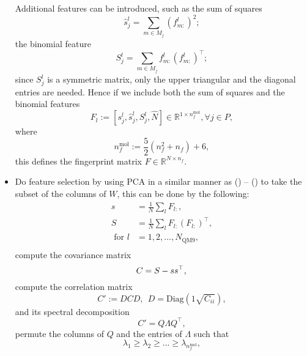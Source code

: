 \documentclass[12pt]{article}
\begin{document}
\begin{itemize}
		Additional features can be introduced, such as the sum of squares
		\begin{equation}
			\hat{s}^l_j = \sum_{m \in M_j} (f^l_{m:})^2;
		\end{equation}
		the binomial feature
		\begin{equation}
			S^l_j = \sum_{m \in M_j} f^l_{m:}(f^l_{m:})^\top;
		\end{equation}
		since $S^l_j$ is a symmetric matrix, only the upper triangular and the diagonal entries are needed. 
		Hence if we include both the sum of squares and the binomial features
		\begin{equation}
			F_l := [s^l_{j}, \hat{s}^l_{j}, S^l_j, \hat{N} ] \in \mathbb{R}^{1 \times n_f^\text{mol}}, \forall j \in P,
		\end{equation}
        where
		\begin{equation}
			n_f^\text{mol} := \frac{5}{2}(n_f^2+n_f)+6,
		\end{equation}
    	this defines the fingerprint matrix $F \in \mathbb{R}^{N \times n_f}$.
    \item Do feature selection by using PCA in a similar manner as () -- () to take the subset of the columns of $W$, this can be done by the following:
	    \begin{equation}
			\label{eq:pca_mol_start}
			\begin{split}
				s &= \frac{1}{N} \sum_l F_{l:}, \\
				S &= \frac{1}{N} \sum_l F_{l:}(F_{l:})^\top, \\
				\text{ for } l &= 1,2,...,N_\text{QM9}, \\
			\end{split}
	    \end{equation}
		compute the covariance matrix
		\begin{equation}
			C = S - ss^\top, \\			
		\end{equation}
		compute the correlation matrix
		\begin{equation}
			C' := DCD, ~~ D = \text{Diag}(1\sqrt{C_{ii}}),
		\end{equation}
		and its spectral decomposition
		\begin{equation}
			C' = Q\Lambda Q^\top,
		\end{equation}
		permute the columns of $Q$ and the entries of $\Lambda$ such that
		\begin{equation}
			\lambda_{1} \geq \lambda_{2} \geq  ... \geq \lambda_{n^\text{mol}_f},

\end{equation}
\end{itemize}
\end{document}
